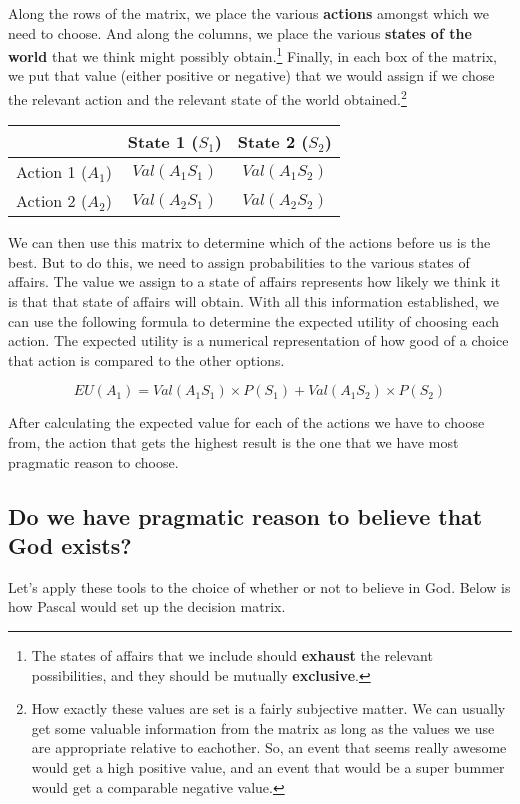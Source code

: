 \documentclass[letterpaper,10pt]{article}
\begin{document}
Along the rows of the matrix, we place the various \textbf{actions} amongst which we need to choose.  And along the columns, we place the various \textbf{states of the world} that we think might possibly obtain.\footnote{The states of affairs that we include should \textbf{exhaust} the relevant possibilities, and they should be mutually \textbf{exclusive}.}  Finally, in each box of the matrix, we put that value (either positive or negative) that we would assign if we chose the relevant action and the relevant state of the world obtained.\footnote{How exactly these values are set is a fairly subjective matter.  We can usually get some valuable information from the matrix as long as the values we use are appropriate relative to eachother.  So, an event that seems really awesome would get a high positive value, and an event that would be a super bummer would get a comparable negative value.}

\begin{center}
 \begin{tabular}{c|c|c|}
 & State 1 ($S_1$) & State 2 ($S_2$) \\ \hline
Action 1 ($A_1$) & $Val(A_1S_1)$ & $Val(A_1S_2)$ \\ \hline
Action 2 ($A_2$) & $Val(A_2S_1)$ & $Val(A_2S_2)$ \\ \hline
\end{tabular}
\end{center}

We can then use this matrix to determine which of the actions before us is the best.  But to do this, we need to assign probabilities to the various states of affairs.  The value we assign to a state of affairs represents how likely we think it is that that state of affairs will obtain.  With all this information established, we can use the following formula to determine the expected utility of choosing each action.  The expected utility is a numerical representation of how good of a choice that action is compared to the other options.

\[EU(A_1)=Val(A_1S_1)\times P(S_1) + Val(A_1S_2)\times P(S_2)\]

After calculating the expected value for each of the actions we have to choose from, the action that gets the highest result is the one that we have most pragmatic reason to choose.

\subsection{Do we have pragmatic reason to believe that God exists?}
Let's apply these tools to the choice of whether or not to believe in God.  Below is how Pascal would set up the decision matrix.
\end{document}
